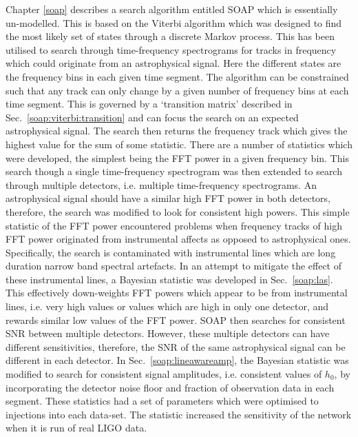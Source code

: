 Chapter \ref{soap} describes a search algorithm entitled SOAP which is essentially un-modelled. 
This is based on the Viterbi algorithm which was designed to find the most likely set of states through a discrete Markov process.
This has been utilised to search through time-frequency spectrograms for tracks in frequency which could originate from an astrophysical signal.
Here the different states are the frequency bins in each given time segment.
The algorithm can be constrained such that any track can only change by a given number of frequency bins at each time segment. 
This is governed by a `transition matrix' described in Sec.~\ref{soap:viterbi:transition} and can focus the search on an expected astrophysical signal.
The search then returns the frequency track which gives the highest value for the sum of some statistic.
There are a number of statistics which were developed, the simplest being the \gls{FFT} power in a given frequency bin.
This search though a single time-frequency spectrogram was then extended to search through multiple detectors, i.e. multiple time-frequency spectrograms.
An astrophysical signal should have a similar high \gls{FFT} power in both detectors, therefore, the search was modified to look for consistent high powers.
This simple statistic of the \gls{FFT} power encountered problems when frequency tracks of high \gls{FFT} power originated from instrumental affects as opposed to astrophysical ones.
Specifically, the search is contaminated with instrumental lines which are long duration narrow band spectral artefacts. 
In an attempt to mitigate the effect of these instrumental lines, a Bayesian statistic was developed in Sec.~\ref{soap:las}.
This effectively down-weights \gls{FFT} powers which appear to be from instrumental lines, i.e. very high values or values which are high in only one detector, and rewards similar low values of the \gls{FFT} power.
SOAP then searches for consistent \gls{SNR} between multiple detectors.
However, these multiple detectors can have different sensitivities, therefore, the \gls{SNR} of the same astrophysical signal can be different in each detector.
In Sec.~\ref{soap:lineawareamp}, the Bayesian statistic was modified to search for consistent signal amplitudes, i.e. consistent values of $h_0$, by incorporating the detector noise floor and fraction of observation data in each segment.
These statistics had a set of parameters which were optimised to injections into each data-set. 
The statistic increased the sensitivity of the network when it is run of real \gls{LIGO} data. 

